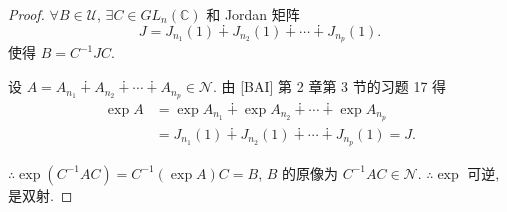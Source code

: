 \documentclass[color=black,device=normal,lang=cn,mode=geye]{elegantnote}
\begin{document}
\begin{proof}
    $\forall B\in\mathscr{U}$, $\exists C\in GL_n(\mathbb{C})$ 和 Jordan 矩阵
    \[J=J_{n_1}(1)\dotplus J_{n_2}(1)\dotplus\cdots\dotplus J_{n_p}(1).\]
    使得 $B=C^{-1}JC$.

    设 $A=A_{n_1}\dotplus A_{n_2}\dotplus\cdots\dotplus A_{n_p}\in\mathscr{N}$. 由 [BAI] 第 2 章第 3 节的习题 17 得
    \begin{align*}
        \exp A & =\exp A_{n_1}\dotplus\exp A_{n_2}\dotplus\cdots\dotplus\exp A_{n_p} \\
        & =J_{n_1}(1)\dotplus J_{n_2}(1)\dotplus\cdots\dotplus J_{n_p}(1)=J.
    \end{align*}

    $\therefore\exp(C^{-1}AC)=C^{-1}(\exp A)C=B$, $B$ 的原像为 $C^{-1}AC\in\mathscr{N}$. $\therefore\exp$ 可逆, 是双射.
\end{proof}
\end{document}
